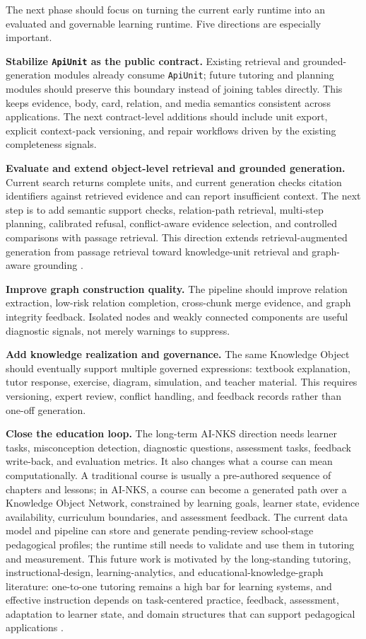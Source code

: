 \documentclass[11pt,letterpaper]{article}
\newcommand{\code}[1]{\nolinkurl{#1}}
\begin{document}
The next phase should focus on turning the current early runtime into an evaluated and governable learning runtime. Five directions are especially important.

\textbf{Stabilize \code{ApiUnit} as the public contract.}
Existing retrieval and grounded-generation modules already consume \code{ApiUnit}; future tutoring and planning modules should preserve this boundary instead of joining tables directly. This keeps evidence, body, card, relation, and media semantics consistent across applications. The next contract-level additions should include unit export, explicit context-pack versioning, and repair workflows driven by the existing completeness signals.

\textbf{Evaluate and extend object-level retrieval and grounded generation.}
Current search returns complete units, and current generation checks citation identifiers against retrieved evidence and can report insufficient context. The next step is to add semantic support checks, relation-path retrieval, multi-step planning, calibrated refusal, conflict-aware evidence selection, and controlled comparisons with passage retrieval. This direction extends retrieval-augmented generation from passage retrieval toward knowledge-unit retrieval and graph-aware grounding \cite{gao-rag-survey,pan-llm-kg}.

\textbf{Improve graph construction quality.}
The pipeline should improve relation extraction, low-risk relation completion, cross-chunk merge evidence, and graph integrity feedback. Isolated nodes and weakly connected components are useful diagnostic signals, not merely warnings to suppress.

\textbf{Add knowledge realization and governance.}
The same Knowledge Object should eventually support multiple governed expressions: textbook explanation, tutor response, exercise, diagram, simulation, and teacher material. This requires versioning, expert review, conflict handling, and feedback records rather than one-off generation.

\textbf{Close the education loop.}
The long-term AI-NKS direction needs learner tasks, misconception detection, diagnostic questions, assessment tasks, feedback write-back, and evaluation metrics. It also changes what a course can mean computationally. A traditional course is usually a pre-authored sequence of chapters and lessons; in AI-NKS, a course can become a generated path over a Knowledge Object Network, constrained by learning goals, learner state, evidence availability, curriculum boundaries, and assessment feedback. The current data model and pipeline can store and generate pending-review school-stage pedagogical profiles; the runtime still needs to validate and use them in tutoring and measurement. This future work is motivated by the long-standing tutoring, instructional-design, learning-analytics, and educational-knowledge-graph literature: one-to-one tutoring remains a high bar for learning systems, and effective instruction depends on task-centered practice, feedback, assessment, adaptation to learner state, and domain structures that can support pedagogical applications \cite{bloom-two-sigma,merrill,anderson-krathwohl,vanlehn,koedinger-kli,siemens-learning-analytics,qu-education-kg}.
\end{document}

